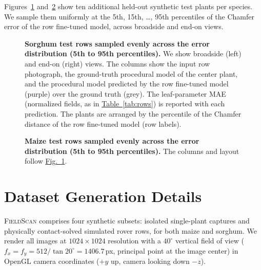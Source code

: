 \documentclass[10pt,twocolumn,letterpaper]{article}
\newcommand{\figref}[1]{\hyperref[#1]{Fig.~\ref*{#1}}}
\newcommand{\tabref}[1]{\hyperref[#1]{Table~\ref*{#1}}}
\newcommand{\dataset}{\textup{\textsc{FieldScan}}}
\begin{document}
\textcolor{cvprblue}{Figures}~\ref{fig:supp-rows-sorghum} and~\ref{fig:supp-rows-maize} show ten additional held-out synthetic test plants per species. We sample them uniformly at the 5th, 15th, \dots, 95th percentiles of the Chamfer error of the row fine-tuned model, across broadside and end-on views.

\begin{figure}[t!]
  \centering
  \resizebox{0.95\linewidth}{!}{}
  \caption{\textbf{Sorghum test rows sampled evenly across the error distribution (5th to 95th percentiles).} We show broadside (left) and end-on (right) views. The columns show the input row photograph, the ground-truth procedural model of the center plant, and the procedural model predicted by the row fine-tuned model (purple) over the ground truth (grey). The leaf-parameter MAE (normalized fields, as in \tabref{tab:rows}) is reported with each prediction. The plants are arranged by the percentile of the Chamfer distance of the row fine-tuned model (row labels).}
  \label{fig:supp-rows-sorghum}
\end{figure}

\begin{figure}[t!]
  \centering
  \resizebox{\linewidth}{!}{}
  \caption{\textbf{Maize test rows sampled evenly across the error distribution (5th to 95th percentiles).} The columns and layout follow \figref{fig:supp-rows-sorghum}.}
  \label{fig:supp-rows-maize}
\end{figure}

\clearpage

\section{Dataset Generation Details}
\label{app:data}

\dataset{} comprises four synthetic subsets: isolated single-plant captures and physically contact-solved simulated rover rows, for both maize and sorghum. We render all images at $1024 \times 1024$ resolution with a $40^\circ$ vertical field of view ($f_x = f_y = 512 / \tan 20^\circ = 1406.7$\,px, principal point at the image center) in OpenGL camera coordinates ($+y$ up, camera looking down $-z$).
\end{document}
